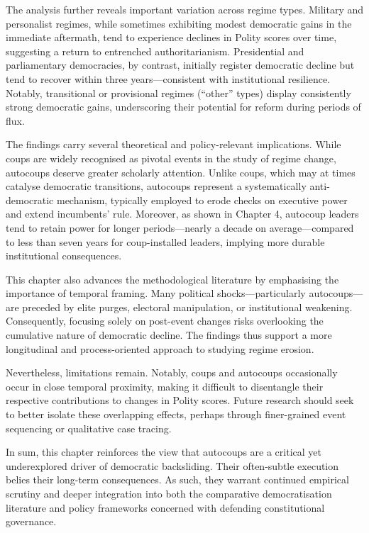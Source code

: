 \documentclass[
  12pt,
]{report}
\begin{document}
The analysis further reveals important variation across regime types.
Military and personalist regimes, while sometimes exhibiting modest
democratic gains in the immediate aftermath, tend to experience declines
in Polity scores over time, suggesting a return to entrenched
authoritarianism. Presidential and parliamentary democracies, by
contrast, initially register democratic decline but tend to recover
within three years---consistent with institutional resilience. Notably,
transitional or provisional regimes (``other'' types) display
consistently strong democratic gains, underscoring their potential for
reform during periods of flux.

The findings carry several theoretical and policy-relevant implications.
While coups are widely recognised as pivotal events in the study of
regime change, autocoups deserve greater scholarly attention. Unlike
coups, which may at times catalyse democratic transitions, autocoups
represent a systematically anti-democratic mechanism, typically employed
to erode checks on executive power and extend incumbents' rule.
Moreover, as shown in Chapter 4, autocoup leaders tend to retain power
for longer periods---nearly a decade on average---compared to less than
seven years for coup-installed leaders, implying more durable
institutional consequences.

This chapter also advances the methodological literature by emphasising
the importance of temporal framing. Many political shocks---particularly
autocoups---are preceded by elite purges, electoral manipulation, or
institutional weakening. Consequently, focusing solely on post-event
changes risks overlooking the cumulative nature of democratic decline.
The findings thus support a more longitudinal and process-oriented
approach to studying regime erosion.

Nevertheless, limitations remain. Notably, coups and autocoups
occasionally occur in close temporal proximity, making it difficult to
disentangle their respective contributions to changes in Polity scores.
Future research should seek to better isolate these overlapping effects,
perhaps through finer-grained event sequencing or qualitative case
tracing.

In sum, this chapter reinforces the view that autocoups are a critical
yet underexplored driver of democratic backsliding. Their often-subtle
execution belies their long-term consequences. As such, they warrant
continued empirical scrutiny and deeper integration into both the
comparative democratisation literature and policy frameworks concerned
with defending constitutional governance.
\end{document}
